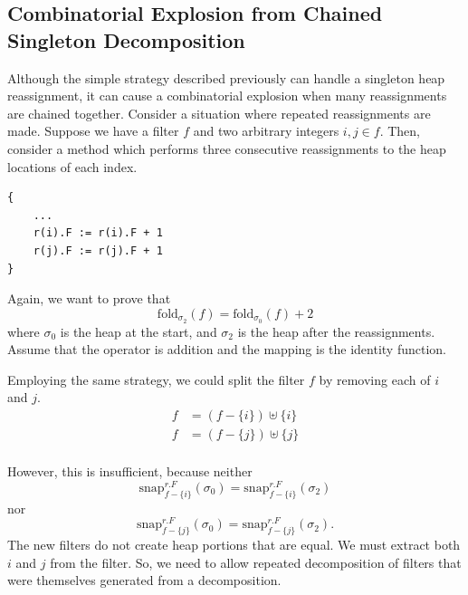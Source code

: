 \documentclass[msc,oneside]{ubcthesis}
\theoremstyle{definition}
\begin{document}
\subsection{Combinatorial Explosion from Chained Singleton Decomposition}
Although the simple strategy described previously can handle a singleton heap reassignment, it can cause a combinatorial explosion when many reassignments are chained together. Consider a situation where repeated reassignments are made. Suppose we have a filter $f$ and two arbitrary integers $i, j \in f$. Then, consider a method which performs three consecutive reassignments to the heap locations of each index.
\begin{lstlisting}
{
    ...
    r(i).F := r(i).F + 1 
    r(j).F := r(j).F + 1 
}
\end{lstlisting}

Again, we want to prove that $$\textrm{fold}_{\sigma_2}(f) = \textrm{fold}_{\sigma_0}(f) + 2 $$ where $\sigma_0$ is the heap at the start, and $\sigma_2$ is the heap after the reassignments. Assume that the operator is addition and the mapping is the identity function.

Employing the same strategy, we could split the filter $f$ by removing each of $i$ and $j$.
\begin{align*} 
f &= \left( f - \{i\}\right) \uplus \{i\} \\
f &= \left( f - \{j\}\right) \uplus \{j\} \\
\end{align*}

However, this is insufficient, because neither $$\textrm{snap}^{r.F}_{f - \{i\}}(\sigma_0) = \textrm{snap}^{r.F}_{f - \{i\}}(\sigma_2)$$ nor $$\textrm{snap}^{r.F}_{f - \{j\}}(\sigma_0) = \textrm{snap}^{r.F}_{f - \{j\}}(\sigma_2).$$
The new filters do not create heap portions that are equal. We must extract both $i$ and $j$ from the filter. So, we need to allow repeated decomposition of filters that were themselves generated from a decomposition.
\end{document}
